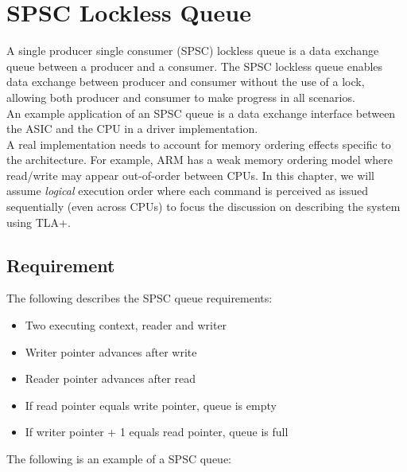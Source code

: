 % 

\chapter{SPSC Lockless Queue}

A single producer single consumer (SPSC) lockless queue is a data exchange queue
between a producer and a consumer. The SPSC lockless queue enables data exchange
between producer and consumer without the use of a lock, allowing both producer
and consumer to make progress in all scenarios.\\

An example application of an SPSC queue is a data exchange interface between the ASIC
and the CPU in a driver implementation.\\

A real implementation needs to account for memory ordering effects specific to
the architecture. For example, ARM has a weak memory ordering model where
read/write may appear out-of-order between CPUs. In this chapter, we will assume
\textit{logical} execution order where each command is perceived as issued
sequentially (even across CPUs) to focus the discussion on describing the system
using TLA+.\\

\section{Requirement}

The following describes the SPSC queue requirements: 

\begin{itemize}
    \item Two executing context, reader and writer
    \item Writer pointer advances after write 
    \item Reader pointer advances after read
    \item If read pointer equals write pointer, queue is empty
    \item If writer pointer + 1 equals read pointer, queue is full
\end{itemize}

The following is an example of a SPSC queue:
\begin{center}
\end{center}

